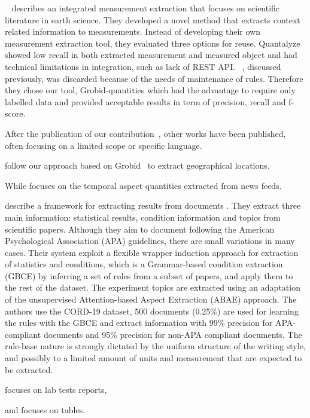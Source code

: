 \documentclass[12pt, a4paper]{report}
\begin{document}
~\cite{hundman2017measurement} describes an integrated measurement extraction that focuses on scientific literature in earth science. 
They developed a novel method that extracts context related information to measurements. Instead of developing their own measurement extraction tool, they evaluated three options for reuse. Quantalyze showed low recall in both extracted measurement and measured object and had technical limitations in integration, such as lack of REST API. ~\cite{agatonovic2008large}, discussed previously, was discarded because of the needs of maintenance of rules. 
Therefore they chose our tool, Grobid-quantities which had the advantage to require only labelled data and provided acceptable results in term of precision, recall and f-score. 

After the publication of our contribution~\cite{foppiano2019quantities}, other works have been published, often focusing on a limited scope or specific language. 

\cite{petersen2021geoquantities} follow our approach based on Grobid~\cite{GROBID} to extract geographical locations.


While \cite{ning2022ameta} focuses on the temporal aspect quantities extracted from news feeds. 

\cite{epp2021stereo} describe a framework for extracting results from documents . They extract three main information: statistical results, condition information and topics from scientific papers. Although they aim to document following the American Psychological Association (APA) guidelines, there are small variations in many cases. 
Their system exploit a flexible wrapper induction approach for extraction of statistics and conditions, which is a Grammar-based condition extraction (GBCE) by inferring a set of rules from a subset of papers, and apply them to the rest of the dataset. The experiment topics are extracted using an adaptation of the unsupervised Attention-based Aspect Extraction (ABAE) approach. 
The authors use the CORD-19 dataset, 500 documents (0.25\%) are used for learning the rules with the GBCE and extract information with 99\% precision for APA-compliant documents and 95\% precision for non-APA compliant documents. 
The rule-base nature is strongly dictated by the uniform structure of the writing style, and possibly to a limited amount of units and measurement that are expected to be extracted. 

\cite{hao2016} focuses on lab tests reports, 

and \cite{taha2021identifying, ho2021qute} focuses on tables.
\end{document}
